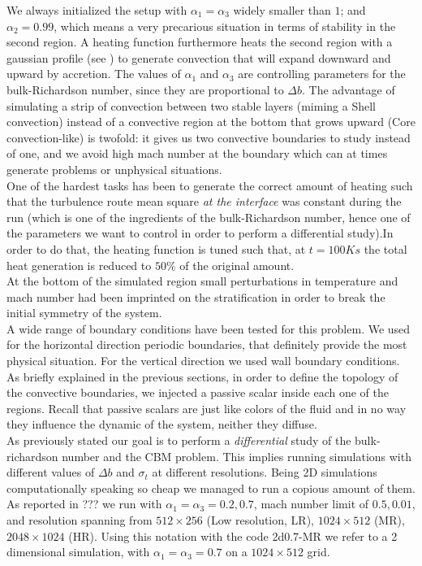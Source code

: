 We always initialized the setup with $\alpha_{1} = \alpha_{3}$ widely smaller than $1$; and $\alpha_{2}=0.99$, which means a very precarious situation in terms of stability in the second region. A heating function furthermore heats the second region with a gaussian profile (see \label{fig:tempprofile}) to generate convection that will expand downward and upward by accretion. The values of $\alpha_{1}$ and $\alpha_{3}$ are controlling parameters for the bulk-Richardson number, since they are proportional to $\Delta b$. The advantage of simulating a strip of convection between two stable layers (miming a Shell convection) instead of a convective region at the bottom that grows upward (Core convection-like) is twofold: it gives us two convective boundaries to study instead of one, and we avoid high mach number at the boundary which can at times generate problems or unphysical situations. \\
One of the hardest tasks has been to generate the correct amount of heating such that the turbulence route mean square \textit{at the interface} was constant during the run (which is one of the ingredients of the bulk-Richardson number, hence one of the parameters we want to control in order to perform a differential study).In order to do that, the heating function is tuned such that, at $t=100K s$ the total heat generation is reduced to $50 \%$ of the original amount.\\ 
At the bottom of the simulated region small perturbations in temperature and mach number had been imprinted on the stratification in order to break the initial symmetry of the system.\\
A wide range of boundary conditions have been tested for this problem. We used for the horizontal direction periodic boundaries, that definitely provide the most physical situation. For the vertical direction we used wall boundary conditions.\\ 
As briefly explained in the previous sections, in order to define the topology of the convective boundaries, we injected a passive scalar inside each one of the regions. Recall that passive scalars are just like colors of the fluid and in no way they influence the dynamic of the system, neither they diffuse.\\
As previously stated our goal is to perform a \textit{differential} study of the bulk-richardson number and the CBM problem. This implies running simulations with different values of $\Delta b$ and $\sigma_t$ at different resolutions. Being 2D simulations computationally speaking so cheap we managed to run a copious amount of them. As reported in ??? we run with $\alpha_1=\alpha_3=0.2, 0.7$, mach number limit of $0.5, 0.01$, and resolution spanning from $512 \times 256$ (Low resolution, LR), $1024 \times 512$ (MR), $2048 \times 1024$ (HR). Using this notation with the code 2d0.7-MR we refer to a 2 dimensional simulation, with $\alpha_1=\alpha_3=0.7$ on a $1024 \times 512$ grid. \\
